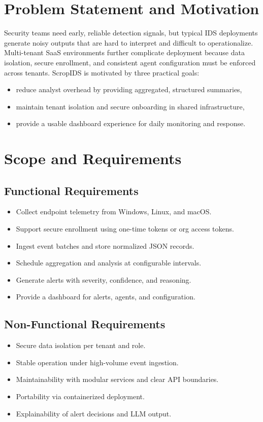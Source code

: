 \documentclass[conference]{IEEEtran}
\begin{document}
\section{Problem Statement and Motivation}
Security teams need early, reliable detection signals, but typical IDS deployments generate noisy outputs that are hard to interpret and difficult to operationalize. Multi-tenant SaaS environments further complicate deployment because data isolation, secure enrollment, and consistent agent configuration must be enforced across tenants. ScropIDS is motivated by three practical goals:
\begin{itemize}[leftmargin=1.2em]
    \item reduce analyst overhead by providing aggregated, structured summaries,
    \item maintain tenant isolation and secure onboarding in shared infrastructure,
    \item provide a usable dashboard experience for daily monitoring and response.
\end{itemize}

\section{Scope and Requirements}
\subsection{Functional Requirements}
\begin{itemize}[leftmargin=1.2em]
    \item Collect endpoint telemetry from Windows, Linux, and macOS.
    \item Support secure enrollment using one-time tokens or org access tokens.
    \item Ingest event batches and store normalized JSON records.
    \item Schedule aggregation and analysis at configurable intervals.
    \item Generate alerts with severity, confidence, and reasoning.
    \item Provide a dashboard for alerts, agents, and configuration.
\end{itemize}

\subsection{Non-Functional Requirements}
\begin{itemize}[leftmargin=1.2em]
    \item Secure data isolation per tenant and role.
    \item Stable operation under high-volume event ingestion.
    \item Maintainability with modular services and clear API boundaries.
    \item Portability via containerized deployment.
    \item Explainability of alert decisions and LLM output.
\end{itemize}
\end{document}
